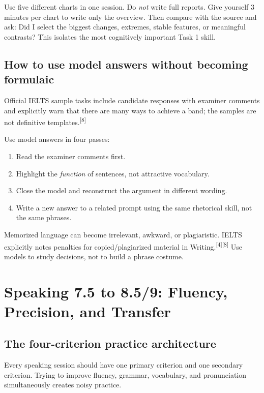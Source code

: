 \documentclass[11pt,a4paper]{article}
\newcommand{\src}[1]{\textsuperscript{[#1]}}
\begin{document}
\begin{practicebox}
Use five different charts in one session. Do \emph{not} write full reports. Give yourself 3 minutes per chart to write only the overview. Then compare with the source and ask: Did I select the biggest changes, extremes, stable features, or meaningful contrasts? This isolates the most cognitively important Task 1 skill.
\end{practicebox}

\subsection{How to use model answers without becoming formulaic}
Official IELTS sample tasks include candidate responses with examiner comments and explicitly warn that there are many ways to achieve a band; the samples are not definitive templates.\src{8}

Use model answers in four passes:
\begin{enumerate}
\item Read the examiner comments first.
\item Highlight the \emph{function} of sentences, not attractive vocabulary.
\item Close the model and reconstruct the argument in different wording.
\item Write a new answer to a related prompt using the same rhetorical skill, not the same phrases.
\end{enumerate}

\begin{warningbox}
Memorized language can become irrelevant, awkward, or plagiaristic. IELTS explicitly notes penalties for copied/plagiarized material in Writing.\src{4}\src{8} Use models to study decisions, not to build a phrase costume.
\end{warningbox}

\section{Speaking 7.5 to 8.5/9: Fluency, Precision, and Transfer}

\subsection{The four-criterion practice architecture}
Every speaking session should have one primary criterion and one secondary criterion. Trying to improve fluency, grammar, vocabulary, and pronunciation simultaneously creates noisy practice.
\end{document}
